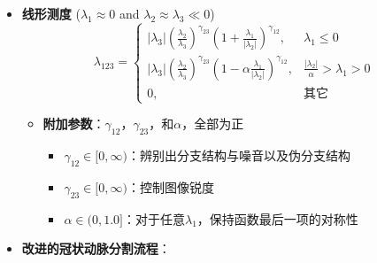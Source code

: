 \begin{frame}
\begin{itemize}
\item \textbf{线形测度} (\alert{$\lambda_1 \approx 0$ and $\lambda_2 \approx \lambda_3 \ll 0$})
\pause \begin{equation*}
\lambda_{123} =
\begin{cases}
\left| \lambda_3 \right| \left( \frac{\lambda_2}{\lambda_3} \right)^{\gamma_{23}} \left( 1 + \frac{\lambda_1}{\left| \lambda_2 \right|} \right)^{\gamma_{12}},        & \lambda_1 \le 0 \\%
\left| \lambda_3 \right| \left( \frac{\lambda_2}{\lambda_3} \right)^{\gamma_{23}} \left( 1 - \alpha \frac{\lambda_1}{\left| \lambda_2 \right|} \right)^{\gamma_{12}}, & \frac{\left| \lambda_2 \right|}{\alpha} > \lambda_1 > 0 \\%
0,                                                                                                                                                                    & \text{其它} %
\end{cases}
\end{equation*}
\begin{itemize}
\pause \item \textbf{附加参数}：$\gamma_{12}$，$\gamma_{23}$，和$\alpha$，全部为正
\begin{itemize}
\item $\gamma_{12} \in [0, \infty)$：辨别出分支结构与噪音以及伪分支结构
\item $\gamma_{23} \in [0, \infty)$：控制图像锐度
\item $\alpha \in (0, 1.0]$：对于任意$\lambda_1$，保持函数最后一项的对称性
\end{itemize}
\end{itemize}
\end{itemize}
\end{frame}

\begin{frame}
\begin{itemize}
  \item \textbf{改进的冠状动脉分割流程}：
\end{itemize}
\begin{figure}[t]
\centering

\end{figure}
\end{frame}

